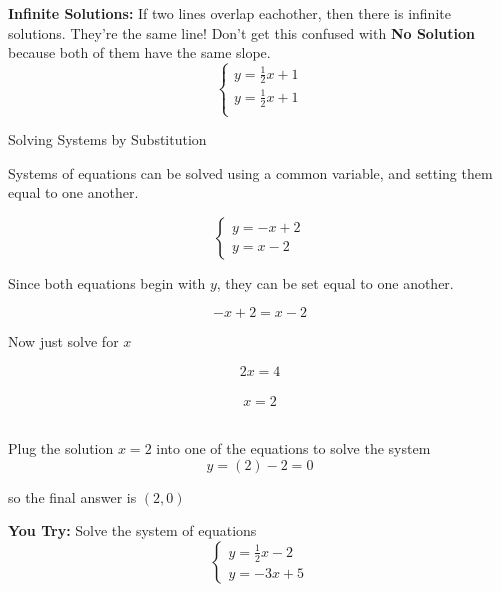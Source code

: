 \documentclass[11pt]{article}
\begin{document}
\pagebreak

\textbf{Infinite Solutions:} If two lines overlap eachother, then there is infinite solutions. They're the same line! Don't get this confused with \textbf{No Solution} because both of them have the same slope.\\

\begin{equation*}
	\begin{cases}
			y=\frac{1}{2}x+1\\

			 y=\frac{1}{2}x+1\\
	\end{cases}
\end{equation*}

\begin{center}
\end{center}

\pagebreak

\begin{center}
	\begin{Large}
		Solving Systems by Substitution\\
	\end{Large}
\end{center}

Systems of equations can be solved using a common variable, and setting them equal to one another. 

\begin{equation*}
	\begin{cases}
		y=-x+2\\
		y=x-2	
	\end{cases}
\end{equation*}


Since both equations begin with $y$, they can be set equal to one another. 

$$-x+2=x-2$$

Now just solve for $x$

$$2x=4$$\ $$x=2$$\

Plug the solution $x=2$ into one of the equations to solve the system\\

$$y=(2)-2=0$$

so the final answer is $(2,0)$

\hrulefill

\textbf{You Try:} Solve the system of equations\\

\begin{equation*}
	\begin{cases}
		y=\frac{1}{2}x-2\\
		y=-3x+5	
	\end{cases}
\end{equation*}
\end{document}
